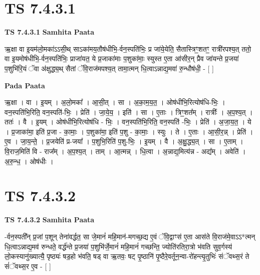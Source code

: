 \documentclass[17pt]{extarticle}
\begin{document}

\section{ TS 7.4.3.1 }

\textbf{TS 7.4.3.1 } \newline
\textbf{Samhita Paata} \newline

ऋ॒क्षा वा इ॒यम॑लो॒मका॑ऽऽसी॒थ् साऽका॑मय॒तौष॑धीभि॒-र्वन॒स्पति॑भिः॒ प्र जा॑ये॒येति॒ सैतास्त्रिꣳ॒॒शतꣳ॒॒ रात्री॑रपश्य॒त् ततो॒ वा इ॒यमोष॑धीभि॒-र्वन॒स्पति॑भिः॒ प्राजा॑यत॒ ये प्र॒जाका॑माः प॒शुका॑माः॒ स्युस्त ए॒ता आ॑सीर॒न् प्रैव जा॑यन्ते प्र॒जया॑ प॒शुभि॑रि॒यं ॅवा अ॑क्षुद्ध्य॒थ् सैतां ॅवि॒राज॑मपश्य॒त् तामा॒त्मन् धि॒त्वाऽन्नाद्य॒मवा॑ रु॒न्धौष॑धी॒ - [  ] \newline

\textbf{Pada Paata} \newline

ऋ॒क्षा । वा । इ॒यम् । अ॒लो॒मका᳚ । आ॒सी॒त् । सा । अ॒का॒म॒य॒त॒ । ओष॑धीभि॒रित्योष॑धि-भिः॒ । वन॒स्पति॑भि॒रिति॒ वन॒स्पति॑-भिः॒ । प्रेति॑ । जा॒ये॒य॒ । इति॑ । सा । ए॒ताः । त्रिꣳ॒॒शत᳚म् । रात्रीः᳚ । अ॒प॒श्य॒त् । ततः॑ । वै । इ॒यम् । ओष॑धीभि॒रित्योष॑धि - भिः॒ । वन॒स्पति॑भि॒रिति॒ वन॒स्पति॑ -भिः॒ । प्रेति॑ । अ॒जा॒य॒त॒ । ये । प्र॒जाका॑मा॒ इति॑ प्र॒जा - का॒माः॒ । प॒शुका॑मा॒ इति॑ प॒शु - का॒माः॒ । स्युः । ते । ए॒ताः । आ॒सी॒र॒न्न् । प्रेति॑ । ए॒व । जा॒य॒न्ते॒ । प्र॒जयेति॑ प्र-जया᳚ । प॒शुभि॒रिति॑ प॒शु-भिः॒ । इ॒यम् । वै । अ॒क्षु॒द्ध्य॒त् । सा । ए॒ताम् । वि॒राज॒मिति॑ वि - राज᳚म् । अ॒प॒श्य॒त् । ताम् । आ॒त्मन्न् । धि॒त्वा । अ॒न्नाद्य॒मित्य॑न्न - अद्य᳚म् । अवेति॑ । अ॒रु॒न्ध॒ । ओष॑धीः ।  \newline





\section{ TS 7.4.3.2 }

\textbf{TS 7.4.3.2 } \newline
\textbf{Samhita Paata} \newline

-र्वन॒स्पती᳚न् प्र॒जां प॒शून् तेना॑वर्द्धत॒ सा जे॒मानं॑ महि॒मान॑-मगच्छ॒द्य ए॒वं ॅवि॒द्वाꣳस॑ ए॒ता आस॑ते वि॒राज॑मे॒वाऽऽ*त्मन् धि॒त्वाऽन्नाद्य॒मव॑ रुन्धते॒ वर्द्ध॑न्ते प्र॒जया॑ प॒शुभि॑र्जे॒मानं॑ महि॒मानं॑ गच्छन्ति॒ ज्योति॑रतिरा॒त्रो भ॑वति सुव॒र्गस्य॑ लो॒कस्यानु॑ख्यात्यै॒ पृष्ठ्यः॑ षड॒हो भ॑वति॒ षड् वा ऋ॒तवः॒ षट् पृ॒ष्ठानि॑ पृ॒ष्ठैरे॒वर्तून॒न्वा-रो॑हन्त्यृ॒तुभिः॑ संॅवथ्स॒रं ते सं॑ॅवथ्स॒र ए॒व - [  ] \newline
\end{document}
